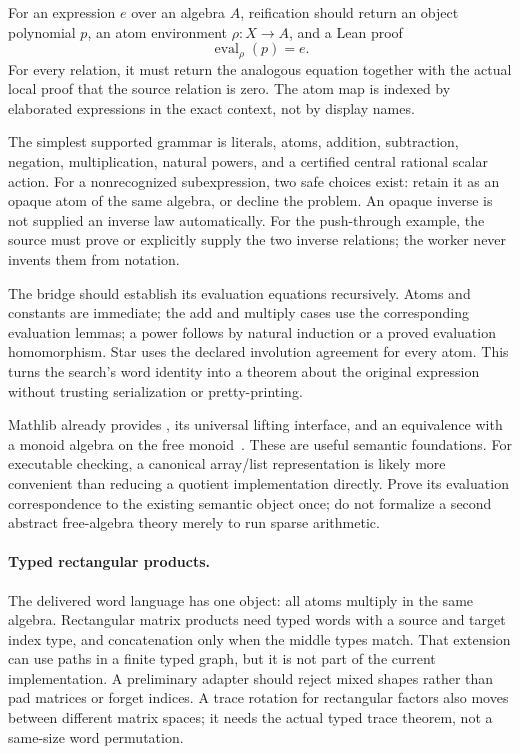 For an expression $e$ over an algebra $A$, reification should return an object
polynomial $p$, an atom environment $\rho:X\to A$, and a Lean proof
\[
 \operatorname{eval}_{\rho}(p)=e.
\]
For every relation, it must return the analogous equation together with the
actual local proof that the source relation is zero. The atom map is indexed
by elaborated expressions in the exact context, not by display names.

The simplest supported grammar is literals, atoms, addition, subtraction,
negation, multiplication, natural powers, and a certified central rational
scalar action. For a nonrecognized subexpression, two safe choices exist:
retain it as an opaque atom of the same algebra, or decline the problem. An
opaque inverse is not supplied an inverse law automatically. For the
push-through example, the source must prove or explicitly supply the two inverse
relations; the worker never invents them from notation.

The bridge should establish its evaluation equations recursively. Atoms and
constants are immediate; the add and multiply cases use the corresponding
evaluation lemmas; a power follows by natural induction or a proved evaluation
homomorphism. Star uses the declared involution agreement for every atom. This
turns the search's word identity into a theorem about the original expression
without trusting serialization or pretty-printing.

Mathlib already provides , its universal lifting interface,
and an equivalence with a monoid algebra on the free monoid~\cite{free-algebra}.
These are useful semantic foundations. For executable checking, a canonical
array/list representation is likely more convenient than reducing a quotient
implementation directly. Prove its evaluation correspondence to the existing
semantic object once; do not formalize a second abstract free-algebra theory
merely to run sparse arithmetic.

\paragraph{Typed rectangular products.}
The delivered word language has one object: all atoms multiply in the same
algebra. Rectangular matrix products need typed words with a source and target
index type, and concatenation only when the middle types match. That extension
can use paths in a finite typed graph, but it is not part of the current
implementation. A preliminary adapter should reject mixed shapes rather than
pad matrices or forget indices. A trace rotation for rectangular factors also
moves between different matrix spaces; it needs the actual typed trace theorem,
not a same-size word permutation.

